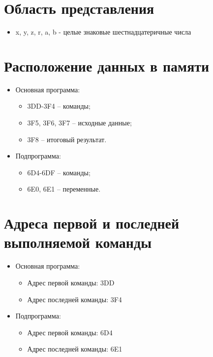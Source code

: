 \documentclass{article}
\begin{document}
\section{Область представления}
\begin{itemize}
  \item x, y, z, r, a, b - целые знаковые шестнадцатеричные числа
\end{itemize}

\section{Расположение данных в памяти}

\begin{itemize}
  \item Основная программа:
        \begin{itemize}
          \item 3DD-3F4 – команды;
          \item 3F5, 3F6, 3F7 – исходные данные;
          \item 3F8 – итоговый результат.
        \end{itemize}
  \item Подпрограмма:
        \begin{itemize}
          \item 6D4-6DF – команды;
          \item 6E0, 6E1 – переменные.
        \end{itemize}
\end{itemize}

\section{Адреса первой и последней выполняемой команды}

\begin{itemize}
  \item Основная программа:
        \begin{itemize}
          \item Адрес первой команды: 3DD
          \item Адрес последней команды: 3F4
        \end{itemize}
  \item Подпрограмма:
        \begin{itemize}
          \item Адрес первой команды: 6D4
          \item Адрес последней команды: 6E1
        \end{itemize}
\end{itemize}
\end{document}
